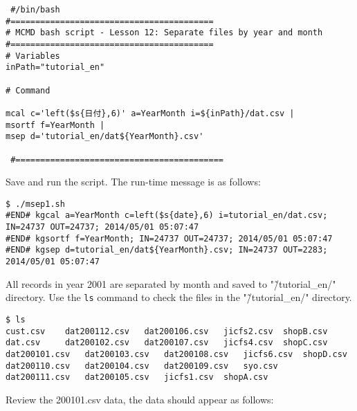  \begin{verbatim}
 #/bin/bash
#=========================================
# MCMD bash script - Lesson 12: Separate files by year and month
#=========================================
# Variables
inPath="tutorial_en"

# Command 

mcal c='left($s{日付},6)' a=YearMonth i=${inPath}/dat.csv |
msortf f=YearMonth |
msep d='tutorial_en/dat${YearMonth}.csv' 

 #==========================================
 \end{verbatim}
 
 
Save and run the script. The run-time message is as follows: \\

\begin{verbatim}
$ ./msep1.sh 
#END# kgcal a=YearMonth c=left($s{date},6) i=tutorial_en/dat.csv; IN=24737 OUT=24737; 2014/05/01 05:07:47
#END# kgsortf f=YearMonth; IN=24737 OUT=24737; 2014/05/01 05:07:47
#END# kgsep d=tutorial_en/dat${YearMonth}.csv; IN=24737 OUT=2283; 2014/05/01 05:07:47
 \end{verbatim}
 
All records in year 2001 are separated by month and saved to "\~/tutorial\_en/" directory. Use the \verb|ls| command to check the files in the "\~/tutorial\_en/" directory.   

 \begin{verbatim}
$ ls
cust.csv	dat200112.csv	dat200106.csv	jicfs2.csv	shopB.csv
dat.csv		dat200102.csv	dat200107.csv	jicfs4.csv	shopC.csv
dat200101.csv	dat200103.csv	dat200108.csv	jicfs6.csv	shopD.csv
dat200110.csv	dat200104.csv	dat200109.csv	syo.csv
dat200111.csv	dat200105.csv	jicfs1.csv	shopA.csv
\end{verbatim}

Review the 200101.csv data, the data should appear as follows: 

